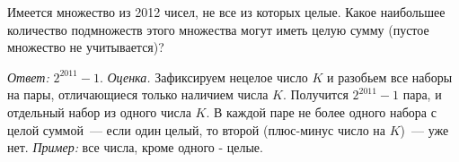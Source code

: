 Имеется множество из 2012 чисел, не все из которых целые.
Какое наибольшее количество подмножеств этого множества могут иметь целую
сумму (пустое множество не учитывается)?

\solution
\emph{Ответ:} $2^{2011} - 1$.
\emph{Оценка.}
Зафиксируем нецелое число $K$ и разобьем все наборы на пары, отличающиеся
только наличием числа $K$.
Получится $2^{2011} - 1$ пара, и отдельный набор из одного числа $K$.
В каждой паре не более одного набора с целой суммой~--- если один целый,
то второй (плюс-минус число на $K$)~--- уже нет.
\emph{Пример:}
все числа, кроме одного - целые.

